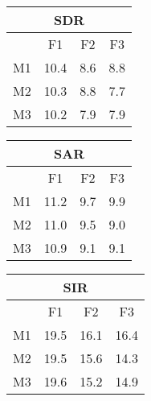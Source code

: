 \documentclass[11pt]{article} %
\begin{document}
\begin{table*}[t]
\centering
\begin{tabular}{|l|c|c|c |}
  \hline\hline
     \multicolumn{4}{|c|}{SDR}\\
  \hline
\,  & F1 & F2 & F3 \\
\hline
M1 & 10.4  &  8.6  &  8.8\\
M2 &  10.3 &   8.8 &   7.7\\
M3 &  10.2 &  7.9 &   7.9 \\
  \hline
  \hline
\end{tabular}
\hspace{1ex}
\begin{tabular}{|l|c|c|c |}
  \hline\hline
    \multicolumn{4}{|c|}{SAR}\\
\hline
\,  & F1 & F2 & F3 \\
\hline
M1 & 11.2 &   9.7  &  9.9\\
M2 &  11.0  &  9.5 &  9.0\\
M3 &  10.9 & 9.1 &  9.1\\
  \hline
  \hline
\end{tabular}
\hspace{1ex}
\begin{tabular}{|l|c|c|c |}
  \hline\hline
  \multicolumn{4}{|c|}{SIR}\\
  \hline
\,  & F1 & F2 & F3 \\
\hline
M1 & 19.5 & 16.1 & 16.4\\
M2 &  19.5 & 15.6 &  14.3\\
M3 &  19.6 &  15.2 & 14.9\\

  \hline
  \hline
\end{tabular}\\
\caption{SDR \label{ta:eval}}
\end{table*}
\end{document}
